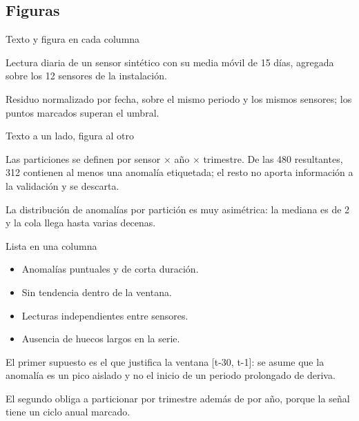 \documentclass[aspectratio=169,9pt]{beamer}
\begin{document}
\subsection{Figuras}

\begin{frame}{Texto y figura en cada columna}
\begin{twocols}

  Lectura diaria de un sensor sintético con su media móvil de 15 días,
  agregada sobre los 12 sensores de la instalación.

\nextcol

  Residuo normalizado por fecha, sobre el mismo periodo y los mismos
  sensores; los puntos marcados superan el umbral.

\end{twocols}
\end{frame}

\begin{frame}{Texto a un lado, figura al otro}
\begin{twocols}

  Las particiones se definen por sensor $\times$ año $\times$ trimestre. De
  las 480 resultantes, 312 contienen al menos una anomalía etiquetada; el
  resto no aporta información a la validación y se descarta.

  La distribución de anomalías por partición es muy asimétrica: la mediana
  es de 2 y la cola llega hasta varias decenas.
\nextcol
\end{twocols}
\end{frame}

\begin{frame}{Lista en una columna}
\begin{twocols}

  \begin{itemize}
    \item Anomalías puntuales y de corta duración.
    \item Sin tendencia dentro de la ventana.
    \item Lecturas independientes entre sensores.
    \item Ausencia de huecos largos en la serie.
  \end{itemize}
\nextcol

  El primer supuesto es el que justifica la ventana [t-30, t-1]: se asume
  que la anomalía es un pico aislado y no el inicio de un periodo prolongado
  de deriva.

  El segundo obliga a particionar por trimestre además de por año, porque
  la señal tiene un ciclo anual marcado.
\end{twocols}
\end{frame}
\end{document}
